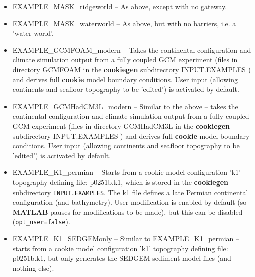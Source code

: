 \begin{itemize}[noitemsep]
\vspace{1mm}
\item \textsf{\footnotesize EXAMPLE\_MASK\_ridgeworld} -- As above, except with no gateway.

\vspace{1mm}
\item \textsf{\footnotesize EXAMPLE\_MASK\_waterworld} -- As above, but with no barriers, i.e. a 'water world'.

\vspace{1mm}
\item \textsf{\footnotesize EXAMPLE\_GCMFOAM\_modern} -- Takes the continental configuration and climate simulation output from a fully coupled GCM experiment (files in directory \footnotesize\textsf{GCMFOAM }\normalsize in the \textbf{cookiegen} subdirectory \footnotesize\textsf{INPUT.EXAMPLES }\normalsize) and derives full \textbf{cookie} model boundary conditions. User input (allowing continents and seafloor topography to be 'edited') is activated by default.

\vspace{1mm}
\item \textsf{\footnotesize EXAMPLE\_GCMHadCM3L\_modern} -- Similar to the above -- takes the continental configuration and climate simulation output from a fully coupled GCM experiment (files in directory \footnotesize\textsf{GCMHadCM3L }\normalsize in the \textbf{cookiegen} subdirectory \footnotesize\textsf{INPUT.EXAMPLES }\normalsize) and derives full \textbf{cookie} model boundary conditions. User input (allowing continents and seafloor topography to be 'edited') is activated by default.

\vspace{1mm}
\item \textsf{\footnotesize EXAMPLE\_K1\_permian} -- Starts from a cookie model configuration 'k1' topography defining file: \textsf{\footnotesize p0251b.k1}, which is stored in the \textbf{cookiegen} subdirectory \texttt{INPUT.EXAMPLES}. The k1 file defines a late Permian continental configuration (and bathymetry). User modification is enabled by default (so \textbf{MATLAB} pauses for modifications to be made), but this can be disabled (\texttt{opt\_user=false}).

\vspace{1mm}
\item \textsf{\footnotesize EXAMPLE\_K1\_SEDGEMonly} -- Similar to \textsf{\footnotesize EXAMPLE\_K1\_permian} -- starts from a cookie model configuration 'k1' topography defining file: \textsf{\footnotesize p0251b.k1}, but only generates the SEDGEM sediment model files (and nothing else).


\end{itemize}
